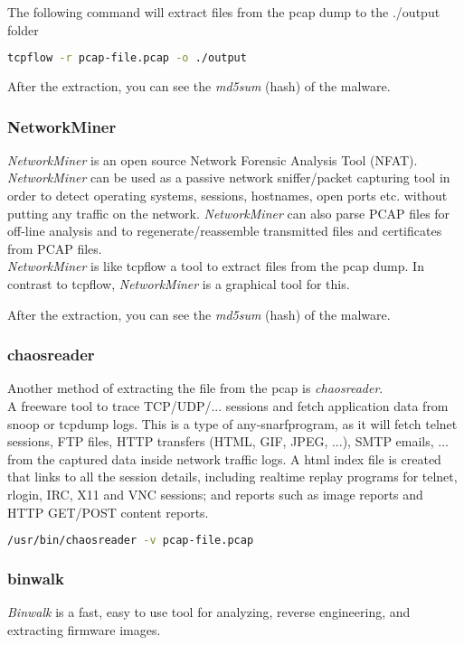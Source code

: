 The following command will extract files from the pcap dump to the ./output folder
\begin{lstlisting}[language=bash]
    tcpflow -r pcap-file.pcap -o ./output
\end{lstlisting}

After the extraction, you can see the \textit{md5sum} (hash) of the malware.

\subsubsection{NetworkMiner}
\textit{NetworkMiner} is an open source Network Forensic Analysis Tool (NFAT). \textit{NetworkMiner} can be used as a passive network sniffer/packet capturing tool in order to detect operating systems, sessions, hostnames, open ports etc. without putting any traffic on the network. \textit{NetworkMiner} can also parse PCAP files for off-line analysis and to regenerate/reassemble transmitted files and certificates from PCAP files.\\

\textit{NetworkMiner} is like tcpflow a tool to extract files from the pcap dump.
In contrast to tcpflow, \textit{NetworkMiner} is a graphical tool for this.

After the extraction, you can see the \textit{md5sum} (hash) of the malware.

\subsubsection{chaosreader}
Another method of extracting the file from the pcap is \textit{chaosreader}.\\

A freeware tool to trace TCP/UDP/... sessions and fetch application data from snoop or tcpdump logs. This is a type of \glqq any-snarf\grqq program, as it will fetch telnet sessions, FTP files, HTTP transfers (HTML, GIF, JPEG, ...), SMTP emails, ... from the captured data inside network traffic logs. A html index file is created that links to all the session details, including realtime replay programs for telnet, rlogin, IRC, X11 and VNC sessions; and reports such as image reports and HTTP GET/POST content reports.

\begin{lstlisting}[language=bash]
    /usr/bin/chaosreader -v pcap-file.pcap
\end{lstlisting}

\subsubsection{binwalk}
\textit{Binwalk} is a fast, easy to use tool for analyzing, reverse engineering, and extracting firmware images.

